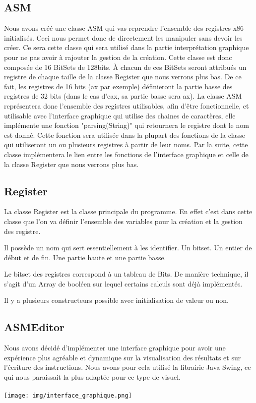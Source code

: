\documentclass{article}
\begin{document}
\subsection{ASM}
Nous avons créé une classe ASM qui vas reprendre l'ensemble des registres x86 initialisés.
Ceci nous permet donc de directement les manipuler sans devoir les créer.
Ce sera cette classe qui sera utilisé dans la partie interprétation graphique pour ne pas avoir à rajouter la gestion de la création.
Cette classe est donc composée de 16 BitSets de 128bits.
À chacun de ces BitSets seront attribués un registre de chaque taille de la classe Register que nous verrons plus bas.
De ce fait, les registres de 16 bits (ax par exemple) définieront la partie basse des registres de 32 bits (dans le cas d'eax, sa partie basse sera ax).
La classe ASM représentera donc l'ensemble des registres utilisables, afin d'être fonctionnelle, et utilisable avec l'interface graphique qui utilise des chaines de caractères, elle implémente une fonction "parsing(String)" qui retournera le registre dont le nom est donné.
Cette fonction sera utilisée dans la plupart des fonctions de la classe qui utiliseront un ou plusieurs registres à partir de leur noms.
Par la suite, cette classe implémentera le lien entre les fonctions de l'interface graphique et celle de la classe Register que nous verrons plus bas.

\subsection{Register}
La classe Register est la classe principale du programme.
En effet c'est dans cette classe que l'on va définir l'ensemble des variables pour la création et la gestion des registre.

Il possède un nom qui sert essentiellement à les identifier.
Un bitset.
Un entier de début et de fin.
Une partie haute et une partie basse.

Le bitset des registres correspond à un tableau de Bits.
De manière technique, il s'agit d'un Array de booléen sur lequel certains calculs sont déjà implémentés.

Il y a plusieurs constructeurs possible avec initialisation de valeur ou non.

\subsection{ASMEditor}

Nous avons décidé d'implémenter une interface graphique pour avoir une expérience plus agréable et dynamique sur la visualisation des résultats et sur
l'écriture des instructions.
Nous avons pour cela utilisé la librairie Java Swing, ce qui nous paraissait la plus adaptée pour ce type de visuel.
\\
\\
\texttt{[image: img/interface\_graphique.png]}
\end{document}
